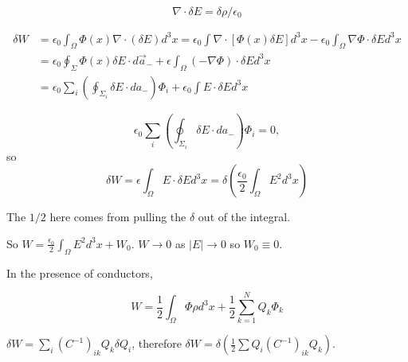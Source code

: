 \documentclass[a4paper,twoside,master.tex]{subfiles}
\begin{document}
\begin{equation}
    \nabla\cdot\delta E = \delta\rho/\epsilon_0
\end{equation}

\begin{align}
    \delta W &= \epsilon_0\int_{\Omega}\Phi(x)\nabla\cdot(\delta E) d^3x = \epsilon_0\int\nabla\cdot[\Phi(x)\delta E]d^3x - \epsilon_0\int_\Omega\nabla\Phi\cdot\delta E d^3x\\
    &=\epsilon_0\oint_\Sigma\Phi(x)\delta E\cdot d\vec{a}_- + \epsilon\int_\Omega(-\nabla\Phi)\cdot\delta E d^3x\\
    &= \epsilon_0\sum_i\left(\oint_{\Sigma_i}\delta E\cdot da_-\right)\Phi_i + \epsilon_0\int E\cdot \delta E d^3x
\end{align}

\begin{equation}
    \epsilon_0\sum_i\left(\oint_{\Sigma_i}\delta E\cdot da_-\right)\Phi_i = 0,
\end{equation}
so
\begin{equation}
    \delta W = \epsilon\int_\Omega E\cdot \delta E d^3x = \delta\left(\frac{\epsilon_0}{2}\int_\Omega E^2 d^3x\right)
\end{equation}

The $1/2$ here comes from pulling the $\delta$ out of the integral.

So $W = \frac{\epsilon_0}{2}\int_\Omega E^2 d^3x + W_0$. $W\to 0$ as $|E|\to 0$ so $W_0\equiv 0$.

In the presence of conductors,

\begin{equation}
   W = \frac{1}{2}\int_\Omega\Phi\rho d^3x + \frac{1}{2}\sum^N_{k=1} Q_k\Phi_k
\end{equation}

\begin{remark}
$\delta W = \sum_i(C^{-1})_{ik}Q_k\delta Q_i$, therefore $\delta W = \delta\left(\frac{1}{2}\sum Q_i(C^{-1})_{ik}Q_k\right)$.
\end{remark}
\end{document}
